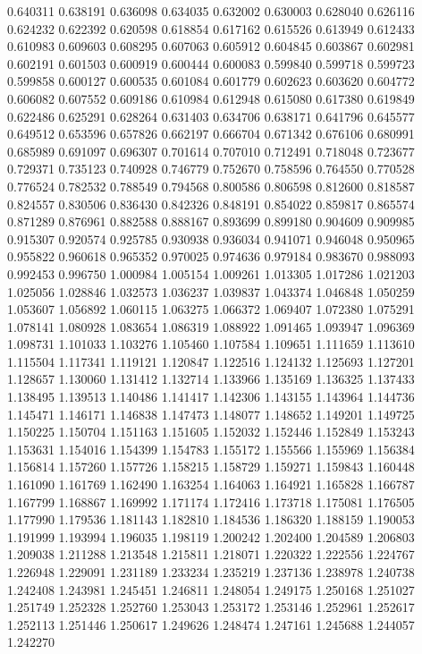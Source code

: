 0.640311
0.638191
0.636098
0.634035
0.632002
0.630003
0.628040
0.626116
0.624232
0.622392
0.620598
0.618854
0.617162
0.615526
0.613949
0.612433
0.610983
0.609603
0.608295
0.607063
0.605912
0.604845
0.603867
0.602981
0.602191
0.601503
0.600919
0.600444
0.600083
0.599840
0.599718
0.599723
0.599858
0.600127
0.600535
0.601084
0.601779
0.602623
0.603620
0.604772
0.606082
0.607552
0.609186
0.610984
0.612948
0.615080
0.617380
0.619849
0.622486
0.625291
0.628264
0.631403
0.634706
0.638171
0.641796
0.645577
0.649512
0.653596
0.657826
0.662197
0.666704
0.671342
0.676106
0.680991
0.685989
0.691097
0.696307
0.701614
0.707010
0.712491
0.718048
0.723677
0.729371
0.735123
0.740928
0.746779
0.752670
0.758596
0.764550
0.770528
0.776524
0.782532
0.788549
0.794568
0.800586
0.806598
0.812600
0.818587
0.824557
0.830506
0.836430
0.842326
0.848191
0.854022
0.859817
0.865574
0.871289
0.876961
0.882588
0.888167
0.893699
0.899180
0.904609
0.909985
0.915307
0.920574
0.925785
0.930938
0.936034
0.941071
0.946048
0.950965
0.955822
0.960618
0.965352
0.970025
0.974636
0.979184
0.983670
0.988093
0.992453
0.996750
1.000984
1.005154
1.009261
1.013305
1.017286
1.021203
1.025056
1.028846
1.032573
1.036237
1.039837
1.043374
1.046848
1.050259
1.053607
1.056892
1.060115
1.063275
1.066372
1.069407
1.072380
1.075291
1.078141
1.080928
1.083654
1.086319
1.088922
1.091465
1.093947
1.096369
1.098731
1.101033
1.103276
1.105460
1.107584
1.109651
1.111659
1.113610
1.115504
1.117341
1.119121
1.120847
1.122516
1.124132
1.125693
1.127201
1.128657
1.130060
1.131412
1.132714
1.133966
1.135169
1.136325
1.137433
1.138495
1.139513
1.140486
1.141417
1.142306
1.143155
1.143964
1.144736
1.145471
1.146171
1.146838
1.147473
1.148077
1.148652
1.149201
1.149725
1.150225
1.150704
1.151163
1.151605
1.152032
1.152446
1.152849
1.153243
1.153631
1.154016
1.154399
1.154783
1.155172
1.155566
1.155969
1.156384
1.156814
1.157260
1.157726
1.158215
1.158729
1.159271
1.159843
1.160448
1.161090
1.161769
1.162490
1.163254
1.164063
1.164921
1.165828
1.166787
1.167799
1.168867
1.169992
1.171174
1.172416
1.173718
1.175081
1.176505
1.177990
1.179536
1.181143
1.182810
1.184536
1.186320
1.188159
1.190053
1.191999
1.193994
1.196035
1.198119
1.200242
1.202400
1.204589
1.206803
1.209038
1.211288
1.213548
1.215811
1.218071
1.220322
1.222556
1.224767
1.226948
1.229091
1.231189
1.233234
1.235219
1.237136
1.238978
1.240738
1.242408
1.243981
1.245451
1.246811
1.248054
1.249175
1.250168
1.251027
1.251749
1.252328
1.252760
1.253043
1.253172
1.253146
1.252961
1.252617
1.252113
1.251446
1.250617
1.249626
1.248474
1.247161
1.245688
1.244057
1.242270
